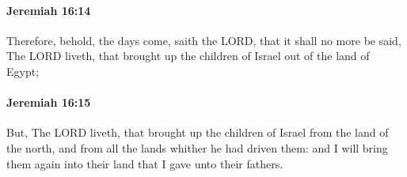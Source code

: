 		\paragraph{Jeremiah 16:14} %
			\label{JEREMIAH-16-14}

			Therefore, behold, the days come, saith the LORD, that it shall no more be said, The LORD liveth, that brought up the children of Israel out of the land of Egypt;


		\paragraph{Jeremiah 16:15} %
			\label{JEREMIAH-16-15}

			But, The LORD liveth, that brought up the children of Israel from the land of the north, and from all the lands whither he had driven them: and I will bring them again into their land that I gave unto their fathers.

